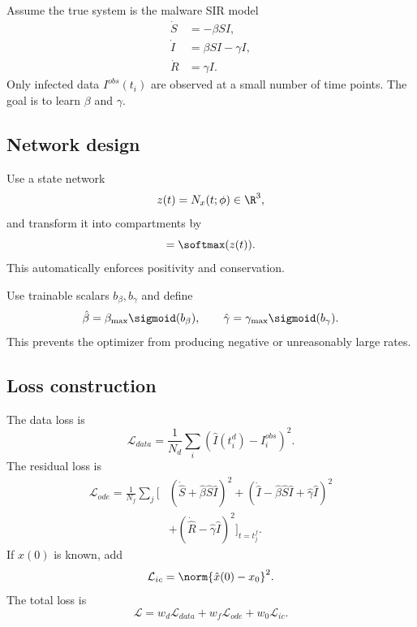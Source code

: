 \documentclass[11pt,a4paper]{article}
\begin{document}
Assume the true system is the malware SIR model
\begin{align}
    \dot{S}&=-\beta SI,\\
    \dot{I}&=\beta SI-\gamma I,\\
    \dot{R}&=\gamma I.
\end{align}
Only infected data $I^{obs}(t_i)$ are observed at a small number of time points. The goal is to learn $\beta$ and $\gamma$.

\subsection{Network design}
Use a state network
\begin{equation}
    z(t)=N_x(t;\phi)\in\R^3,
\end{equation}
and transform it into compartments by
\begin{equation}
    [\hat{S}(t),\hat{I}(t),\hat{R}(t)]=\softmax(z(t)).
\end{equation}
This automatically enforces positivity and conservation.

Use trainable scalars $b_\beta,b_\gamma$ and define
\begin{equation}
    \hat{\beta}=\beta_{\max}\sigmoid(b_\beta),\qquad
    \hat{\gamma}=\gamma_{\max}\sigmoid(b_\gamma).
\end{equation}
This prevents the optimizer from producing negative or unreasonably large rates.

\subsection{Loss construction}
The data loss is
\begin{equation}
    \mathcal{L}_{data}=\frac{1}{N_d}\sum_i(\hat{I}(t_i^d)-I_i^{obs})^2.
\end{equation}
The residual loss is
\begin{align}
    \mathcal{L}_{ode}=\frac{1}{N_f}\sum_j\big[& (\dot{\hat{S}}+\hat{\beta}\hat{S}\hat{I})^2
    +(\dot{\hat{I}}-\hat{\beta}\hat{S}\hat{I}+\hat{\gamma}\hat{I})^2 \\
    &+(\dot{\hat{R}}-\hat{\gamma}\hat{I})^2\big]_{t=t_j^f}.
\end{align}
If $x(0)$ is known, add
\begin{equation}
    \mathcal{L}_{ic}=\norm{\hat{x}(0)-x_0}^2.
\end{equation}
The total loss is
\begin{equation}
    \mathcal{L}=w_d\mathcal{L}_{data}+w_f\mathcal{L}_{ode}+w_0\mathcal{L}_{ic}.
\end{equation}
\end{document}
